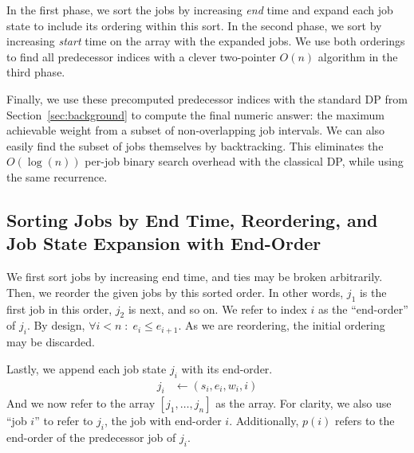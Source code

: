 \documentclass[final,5p,times]{elsarticle}
\newcommand{\code}[1]{\texttt{\detokenize{#1}}}
\begin{document}
In the first phase, we sort the jobs by increasing \textit{end} time and expand each job state to include its ordering within this sort. In the second phase, we sort by increasing \textit{start} time on the array with the expanded jobs. We use both orderings to find all predecessor indices with a clever two-pointer $O(n)$ algorithm in the third phase.

Finally, we use these precomputed predecessor indices with the standard DP from Section~\ref{sec:background} to compute the final numeric answer: the maximum achievable weight from a subset of non-overlapping job intervals. We can also easily find the subset of jobs themselves by backtracking. This eliminates the $O(\log(n))$ per-job binary search overhead with the classical DP, while using the same recurrence. 

\subsection{Sorting Jobs by End Time, Reordering, and Job State Expansion with End-Order}
\label{sec:endtimesort}
We first sort jobs by increasing end time, and ties may be broken arbitrarily. Then, we reorder the given jobs by this sorted order. In other words, $j_1$ is the first job in this order, $j_2$ is next, and so on. We refer to index $i$ as the \enquote{end-order} of $j_i$. By design, $\forall i < n \;:\; e_i \leq e_{i+1}$. As we are reordering, the initial ordering may be discarded.

Lastly, we append each job state $j_i$ with its end-order. 
\begin{align*}
j_i &\gets (s_i, e_i, w_i, i)
\end{align*}
And we now refer to the array $[j_1,\ldots,j_n]$ as the \code{end_ordered} array. For clarity, we also use \enquote{job $i$} to refer to $j_i$, the job with end-order $i$. Additionally, $p(i)$ refers to the end-order of the predecessor job of $j_i$.

\makeatletter
\newif\ifpreprint
\@ifclasswith{elsarticle}{preprint}{\preprinttrue}{\preprintfalse}
\makeatother
\end{document}
